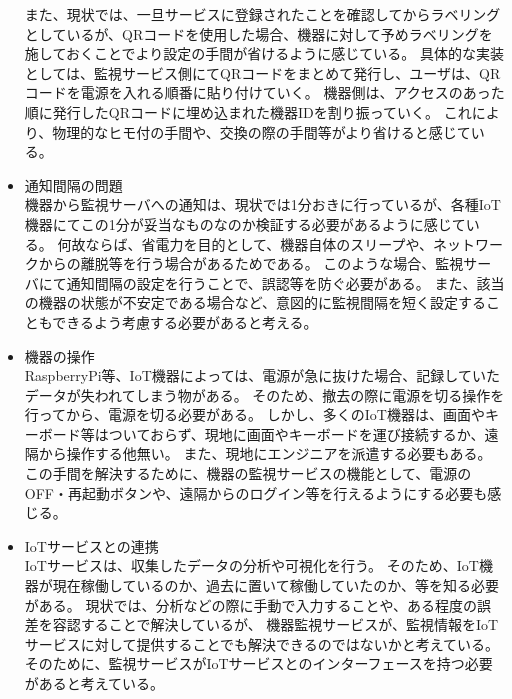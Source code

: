 \begin{itemize}
	また、現状では、一旦サービスに登録されたことを確認してからラベリングとしているが、QRコードを使用した場合、機器に対して予めラベリングを施しておくことでより設定の手間が省けるように感じている。
	具体的な実装としては、監視サービス側にてQRコードをまとめて発行し、ユーザは、QRコードを電源を入れる順番に貼り付けていく。
	機器側は、アクセスのあった順に発行したQRコードに埋め込まれた機器IDを割り振っていく。
	これにより、物理的なヒモ付の手間や、交換の際の手間等がより省けると感じている。
\item  通知間隔の問題\\
	機器から監視サーバへの通知は、現状では1分おきに行っているが、各種IoT機器にてこの1分が妥当なものなのか検証する必要があるように感じている。
	何故ならば、省電力を目的として、機器自体のスリープや、ネットワークからの離脱等を行う場合があるためである。
	このような場合、監視サーバにて通知間隔の設定を行うことで、誤認等を防ぐ必要がある。
	また、該当の機器の状態が不安定である場合など、意図的に監視間隔を短く設定することもできるよう考慮する必要があると考える。
\item 機器の操作\\
	RaspberryPi等、IoT機器によっては、電源が急に抜けた場合、記録していたデータが失われてしまう物がある。
	そのため、撤去の際に電源を切る操作を行ってから、電源を切る必要がある。
	しかし、多くのIoT機器は、画面やキーボード等はついておらず、現地に画面やキーボードを運び接続するか、遠隔から操作する他無い。
	また、現地にエンジニアを派遣する必要もある。
	この手間を解決するために、機器の監視サービスの機能として、電源のOFF・再起動ボタンや、遠隔からのログイン等を行えるようにする必要も感じる。
\item IoTサービスとの連携\\
	IoTサービスは、収集したデータの分析や可視化を行う。
	そのため、IoT機器が現在稼働しているのか、過去に置いて稼働していたのか、等を知る必要がある。
	現状では、分析などの際に手動で入力することや、ある程度の誤差を容認することで解決しているが、
	機器監視サービスが、監視情報をIoTサービスに対して提供することでも解決できるのではないかと考えている。
	そのために、監視サービスがIoTサービスとのインターフェースを持つ必要があると考えている。
\end{itemize}

\begin{comment}
　・IoT機器自体のセキュリティの問題（機器が盗まれた場合や、機器から機器IDを取られた場合について）
　・物理との紐付けの改良（QRコード等を使用し、監視サービスと連携すること）
　・監視間隔の問題（妥当な間隔なのかどうか）
　・機器の操作（機器へログインする、電源のON・OFFを行うこと）
　・IoTサービスとの連携（IoTサービスに対してAPIを提供する等）
　・機器IDの生成（とりあえずハッシュとして設計したが、どの程度の衝突耐性が必要となるのか調べる必要がある、類推されないIDが望まれる）



まだかけていない。

書くことは、問題として認識した3つの事を主軸にこの手法が有効である事を言う。
また、今後どのような拡張等が見込まれるのかを書く。
\end{comment}

